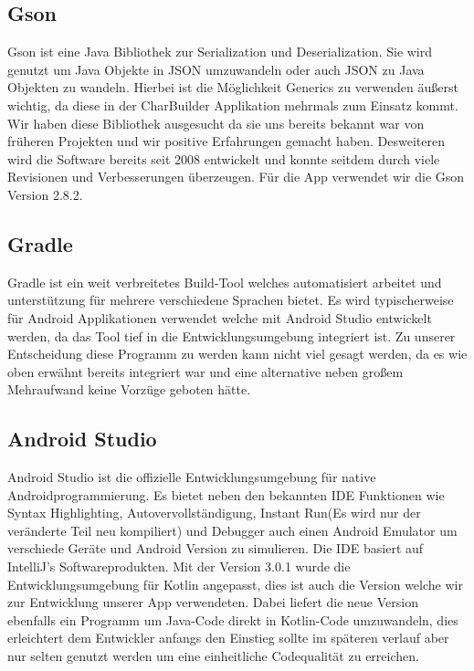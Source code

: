 \subsection{Gson}

Gson ist eine Java Bibliothek zur Serialization und Deserialization. Sie wird genutzt um Java Objekte in JSON umzuwandeln oder auch JSON zu Java Objekten zu wandeln. Hierbei ist die Möglichkeit Generics zu verwenden äußerst wichtig, da diese in der CharBuilder Applikation mehrmals zum Einsatz kommt. Wir haben diese Bibliothek ausgesucht da sie uns bereits bekannt war von früheren Projekten und wir positive Erfahrungen gemacht haben. Desweiteren wird die Software bereits seit 2008 entwickelt und konnte seitdem durch viele Revisionen und Verbesserungen überzeugen. Für die App verwendet wir die Gson Version 2.8.2.

\subsection{Gradle}

Gradle ist ein weit verbreitetes Build-Tool welches automatisiert arbeitet und unterstützung für mehrere verschiedene Sprachen bietet. Es wird typischerweise für Android Applikationen verwendet welche mit Android Studio entwickelt werden, da das Tool tief in die Entwicklungsumgebung integriert ist. Zu unserer Entscheidung diese Programm zu werden kann nicht viel gesagt werden, da es wie oben erwähnt bereits integriert war und eine alternative neben großem Mehraufwand keine Vorzüge geboten hätte.

\subsection{Android Studio}

Android Studio ist die offizielle Entwicklungsumgebung für native Androidprogrammierung. Es bietet neben den bekannten IDE Funktionen wie Syntax Highlighting, Autovervollständigung, Instant Run(Es wird nur der veränderte Teil neu kompiliert) und Debugger auch einen Android Emulator um verschiede Geräte und Android Version zu simulieren. Die IDE basiert auf IntelliJ's Softwareprodukten. Mit der Version 3.0.1 wurde die Entwicklungsumgebung für Kotlin angepasst, dies ist auch die Version welche wir zur Entwicklung unserer App verwendeten. Dabei liefert die neue Version ebenfalls ein Programm um Java-Code direkt in Kotlin-Code umzuwandeln, dies erleichtert dem Entwickler anfangs den Einstieg sollte im späteren verlauf aber nur selten genutzt werden um eine einheitliche Codequalität zu erreichen.


